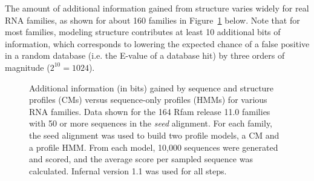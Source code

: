 \documentclass[custom,landscape,final,30pt,plainboxedsections]{sciposter-titleskipsmall}
\begin{document}
\begin{multicols}{3}
The amount of additional information gained from structure varies
widely for real RNA families, as shown for about 160 families in
Figure~\ref{fig:avgscores} below. 
Note that for most families, modeling structure
contributes at least 10 additional bits of information, which
corresponds to lowering the expected chance of a false positive in a
random database (i.e. the E-value of a database hit) by three orders
of magnitude ($2^{10} = 1024$).

\begin{footnotesize}
\begin{figure}
\caption{Additional information (in bits) gained by sequence and
  structure profiles (CMs) versus sequence-only profiles (HMMs) for
  various RNA families.  
  Data shown for the 164 Rfam release 11.0 families
  with 50 or more sequences in the \emph{seed} alignment. For each
  family, the seed alignment was used to build two profile models, a
  CM and a profile HMM. From each model, 10,000 sequences were
  generated and scored, and the average score per sampled sequence was
  calculated. Infernal version 1.1 was used for all steps.
}
\label{fig:avgscores}
\end{figure}
\end{footnotesize}


\end{multicols}
\end{document}

